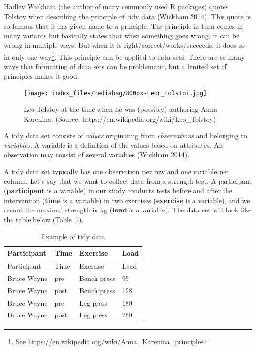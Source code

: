 \documentclass[
  11pt,
  letterpaper,
]{scrbook}
\begin{document}
Hadley Wickham (the author of many commonly used R packages) quotes
Tolstoy when describing the principle of tidy data (Wickham 2014). This
quote is so famous that it has given name to a principle. The principle
in turn comes in many variants but basically states that when something
goes wrong, it can be wrong in multiple ways. But when it is
right/correct/works/succeeds, it does so in only one way\footnote{See
  https://en.wikipedia.org/wiki/Anna\_Karenina\_principle}. This
principle can be applied to data sets. There are so many ways that
formatting of data sets can be problematic, but a limited set of
principles makes it good.

\begin{figure}

{\centering \texttt{[image: index\_files/mediabag/800px-Leon\_tolstoi.jpg]}

}

\caption[Leo Tolstoy]{Leo Tolstoy at the time when he was (possibly)
authoring Anna Karenina. (Source:
https://en.wikipedia.org/wiki/Leo\_Tolstoy)}

\end{figure}

A tidy data set consists of \emph{values} originating from
\emph{observations} and belonging to \emph{variables}. A variable is a
definition of the values based on attributes. An observation may consist
of several variables (Wickham 2014).

A tidy data set typically has one observation per row and one variable
per column. Let's say that we want to collect data from a strength test.
A participant (\textbf{participant} is a variable) in our study conducts
tests before and after the intervention (\textbf{time} is a variable) in
two exercises (\textbf{exercise} is a variable), and we record the
maximal strength in kg (\textbf{load} is a variable). The data set will
look like the table below (Table~\ref{tbl-tidydata}).

\hypertarget{tbl-tidydata}{}
\begin{longtable}[]{@{}llll@{}}
\caption{\label{tbl-tidydata}Example of tidy data}\tabularnewline
\toprule\noalign{}
Participant & Time & Exercise & Load \\
\midrule\noalign{}
\endfirsthead
\toprule\noalign{}
Participant & Time & Exercise & Load \\
\midrule\noalign{}
\endhead
\bottomrule\noalign{}
\endlastfoot
Bruce Wayne & pre & Bench press & 95 \\
Bruce Wayne & post & Bench press & 128 \\
Bruce Wayne & pre & Leg press & 180 \\
Bruce Wayne & post & Leg press & 280 \\
\end{longtable}
\end{document}
